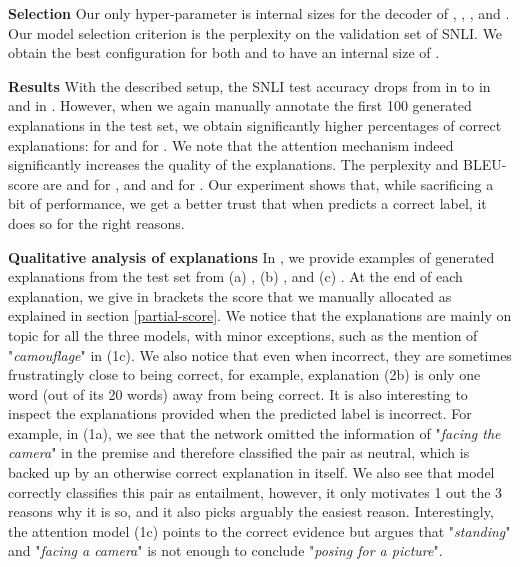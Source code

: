 \textbf{Selection   } Our only hyper-parameter is internal sizes for the decoder of , , , and . Our model selection criterion is the perplexity on the validation set of SNLI. We obtain the best configuration for both \exptwoseqtoseq{} and \exptwoattention{} to have an internal size of . 


\textbf{Results   } With the described setup, the SNLI test accuracy drops from   in \expone{} to   in \exptwoseqtoseq{} and  in \exptwoattention. 
However, when we again manually annotate the first 100 generated explanations in the test set, we obtain significantly higher percentages of correct explanations:  for \exptwoseqtoseq{} and  for \exptwoattention. We note that the attention mechanism indeed significantly increases the quality of the explanations. The perplexity and BLEU-score are  and  for \exptwoseqtoseq{}, and  and   for \exptwoattention. Our experiment shows that, while sacrificing a bit of performance, we get a better trust that when \exptwo{} predicts a correct label, it does so for the right reasons.


\textbf{Qualitative analysis of explanations   } In , we provide examples of generated explanations from the test set from (a) \expone, (b) \exptwoseqtoseq{}, and (c) \exptwoattention. At the end of each explanation, we give in brackets the score that we manually allocated as explained in section \ref{partial-score}. We notice that the explanations are mainly on topic for all the three models, with minor exceptions, such as the mention of "\textit{camouflage}" in (1c). We also notice that even when incorrect, they are sometimes frustratingly close to being correct, for example, explanation (2b) is only one word (out of its 20 words) away from being correct. It is also interesting to inspect the explanations provided when the predicted label is incorrect. For example, in (1a), we see that the network omitted the information of "\textit{facing the camera}" in the premise and therefore classified the pair as neutral, which is backed up by an otherwise correct explanation in itself. We also see that model \exptwoseqtoseq{} correctly classifies this pair as entailment, however, it only motivates 1 out the 3 reasons why it is so, and it also picks arguably the easiest reason. Interestingly, the attention model (1c) points to the correct evidence but argues that "\textit{standing}" and "\textit{facing a camera}" is not enough to conclude "\textit{posing for a picture}". 



